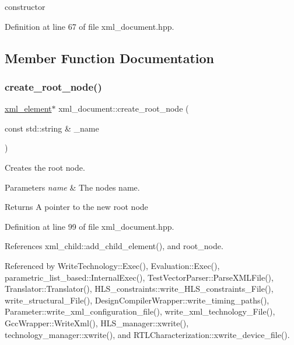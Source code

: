 constructor 



Definition at line 67 of file xml\+\_\+document.\+hpp.



\subsection{Member Function Documentation}
\mbox{\label{classxml__document_affb3c5eca511533f87419fdcd4539cc7}} 
\subsubsection{\texorpdfstring{create\+\_\+root\+\_\+node()}{create\_root\_node()}}
{\footnotesize\ttfamily \hyperlink{classxml__element}{xml\+\_\+element}$\ast$ xml\+\_\+document\+::create\+\_\+root\+\_\+node (\begin{DoxyParamCaption}\item[{const std\+::string \&}]{\+\_\+name }\end{DoxyParamCaption})\hspace{0.3cm}{\ttfamily [inline]}}



Creates the root node. 


\begin{DoxyParams}{Parameters}
{\em name} & The node\textquotesingle{}s name. \\
\hline
\end{DoxyParams}
\begin{DoxyReturn}{Returns}
A pointer to the new root node 
\end{DoxyReturn}


Definition at line 99 of file xml\+\_\+document.\+hpp.



References xml\+\_\+child\+::add\+\_\+child\+\_\+element(), and root\+\_\+node.



Referenced by Write\+Technology\+::\+Exec(), Evaluation\+::\+Exec(), parametric\+\_\+list\+\_\+based\+::\+Internal\+Exec(), Test\+Vector\+Parser\+::\+Parse\+X\+M\+L\+File(), Translator\+::\+Translator(), H\+L\+S\+\_\+constraints\+::write\+\_\+\+H\+L\+S\+\_\+constraints\+\_\+\+File(), write\+\_\+structural\+\_\+\+File(), Design\+Compiler\+Wrapper\+::write\+\_\+timing\+\_\+paths(), Parameter\+::write\+\_\+xml\+\_\+configuration\+\_\+file(), write\+\_\+xml\+\_\+technology\+\_\+\+File(), Gcc\+Wrapper\+::\+Write\+Xml(), H\+L\+S\+\_\+manager\+::xwrite(), technology\+\_\+manager\+::xwrite(), and R\+T\+L\+Characterization\+::xwrite\+\_\+device\+\_\+file().

